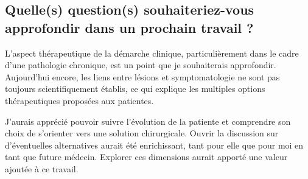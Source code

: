 \subsection{Quelle(s) question(s) souhaiteriez-vous approfondir dans un prochain travail ?}
L’aspect thérapeutique de la démarche clinique, particulièrement dans le cadre d’une pathologie chronique, est un point que je souhaiterais approfondir. Aujourd’hui encore, les liens entre lésions et symptomatologie ne sont pas toujours scientifiquement établis, ce qui explique les multiples options thérapeutiques proposées aux patientes.

J’aurais apprécié pouvoir suivre l’évolution de la patiente et comprendre son choix de s’orienter vers une solution chirurgicale. Ouvrir la discussion sur d’éventuelles alternatives aurait été enrichissant, tant pour elle que pour moi en tant que future médecin. Explorer ces dimensions aurait apporté une valeur ajoutée à ce travail.